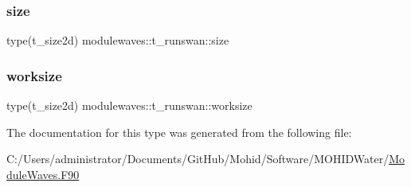 \mbox{\label{structmodulewaves_1_1t__runswan_ab33a46897bf0032110c59a5db5a18b6c}} 
\subsubsection{\texorpdfstring{size}{size}}
{\footnotesize\ttfamily type(t\+\_\+size2d) modulewaves\+::t\+\_\+runswan\+::size\hspace{0.3cm}{\ttfamily [private]}}

\mbox{\label{structmodulewaves_1_1t__runswan_aa6ed4f372e79c87d0f0b711ddb4e32e6}} 
\subsubsection{\texorpdfstring{worksize}{worksize}}
{\footnotesize\ttfamily type(t\+\_\+size2d) modulewaves\+::t\+\_\+runswan\+::worksize\hspace{0.3cm}{\ttfamily [private]}}



The documentation for this type was generated from the following file\+:\begin{DoxyCompactItemize}
\item 
C\+:/\+Users/administrator/\+Documents/\+Git\+Hub/\+Mohid/\+Software/\+M\+O\+H\+I\+D\+Water/\mbox{\hyperlink{_module_waves_8_f90}{Module\+Waves.\+F90}}\end{DoxyCompactItemize}

